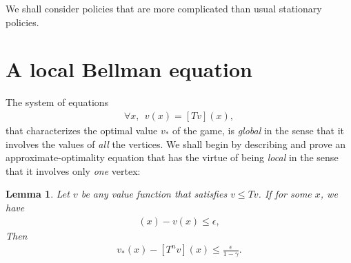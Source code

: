 \documentclass{article}
\newtheorem{lemma}{Lemma}
\begin{document}
We shall consider policies that are more complicated than usual stationary policies. 




\section{A local Bellman equation}

The system of equations
\begin{align}
  \forall x,~~ v(x)=[T v](x),
\end{align}
that characterizes the optimal value $v_*$ of the game, is \emph{global} in the sense that it involves the values of \emph{all} the vertices. We shall begin by describing and prove an approximate-optimality equation that has the virtue of being \emph{local} in the sense that it involves only \emph{one} vertex:
\begin{lemma}
  Let $v$ be any value function that satisfies $v \le Tv$.
  If for some $x$, we have
  \begin{align}
    [T^n v](x) - v(x) \le \epsilon,
  \end{align}
  Then 
  \begin{align}
    v_*(x) - [T^n v](x) \le \frac{\epsilon}{1-\gamma}.
  \end{align}
\end{lemma}
\end{document}
